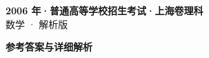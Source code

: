 \documentclass[zihao=-4, a4paper]{ctexart}
\begin{document}
\begin{center}
  {\Large\bfseries 2006 年·普通高等学校招生考试·上海卷理科}\\[4pt]
  {\large 数学 · 解析版}
\end{center}
\medskip
{}

\clearpage
{}
\begin{center}{\Large\bfseries 参考答案与详细解析}\end{center}
\medskip

\end{document}
